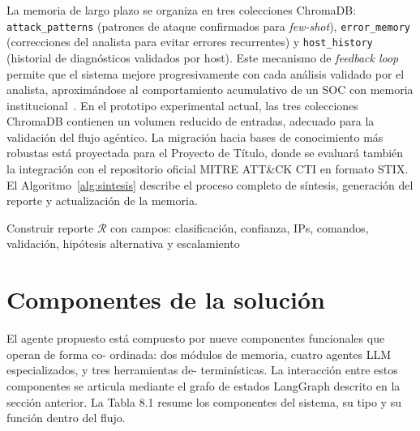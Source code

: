La memoria de largo plazo se organiza en tres colecciones
ChromaDB: \texttt{attack\_patterns} (patrones de ataque
confirmados para \textit{few-shot}), \texttt{error\_memory}
(correcciones del analista para evitar errores recurrentes) y
\texttt{host\_history} (historial de diagnósticos validados
por host). Este mecanismo de \textit{feedback loop} permite
que el sistema mejore progresivamente con cada análisis
validado por el analista, aproximándose al comportamiento
acumulativo de un SOC con memoria
institucional~\cite{ismail2025ivam}. En el prototipo
experimental actual, las tres colecciones ChromaDB
contienen un volumen reducido de entradas, adecuado para
la validación del flujo agéntico. La migración hacia bases
de conocimiento más robustas está proyectada para el Proyecto de Título,
donde se evaluará también la integración con el repositorio
oficial MITRE ATT\&CK CTI en formato STIX. El
Algoritmo~\ref{alg:sintesis} describe el proceso completo de
síntesis, generación del reporte y actualización de la
memoria.

\begin{algorithm}[H]
\caption{Síntesis, reporte y feedback loop}
\label{alg:sintesis}
Construir reporte $\mathcal{R}$ con campos:
    clasificación, confianza, IPs, comandos, validación,
    hipótesis alternativa y escalamiento\;
\;
\end{algorithm}


\section{Componentes de la solución}

El agente propuesto está compuesto por nueve componentes funcionales que operan de forma co- ordinada: dos módulos de memoria, cuatro agentes LLM especializados, y tres herramientas de- terminísticas. La interacción entre estos componentes se articula mediante el grafo de estados LangGraph descrito en la sección anterior. La Tabla 8.1 resume los componentes del sistema, su tipo y su función dentro del flujo.

